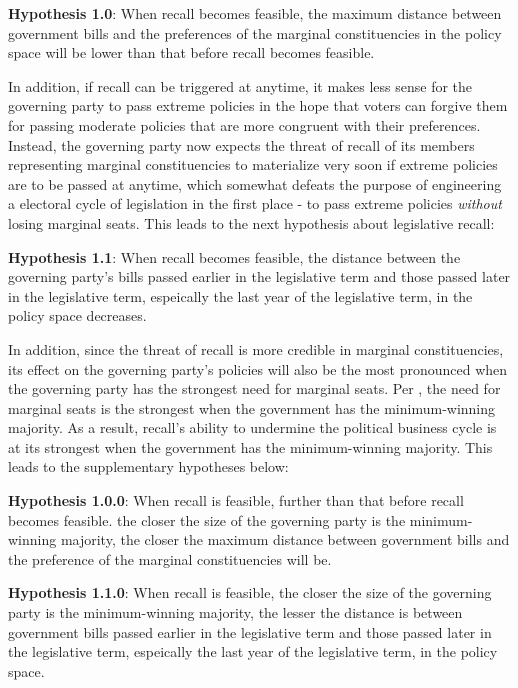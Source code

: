 \documentclass{article}
\begin{document}
		\textbf{Hypothesis 1.0}: When recall becomes feasible,
		the maximum distance between government bills
		and the preferences of the marginal constituencies in the policy space will be lower
		than that before recall becomes feasible.
		
		In addition,
		if recall can be triggered at anytime,
		it makes less sense
		for the governing party
		to pass extreme policies
		in the hope that
		voters can forgive them for passing moderate policies
		that are more congruent with their preferences.
		Instead,
		the governing party now expects the threat of recall 
		of its members representing marginal constituencies
		to materialize very soon if extreme policies are to be passed
		at anytime,
		which somewhat defeats the purpose of engineering a electoral cycle of legislation in the first place -
		to pass extreme policies \textit{without} losing marginal seats.
		This leads to the next hypothesis about legislative recall:
		
		\textbf{Hypothesis 1.1}: When recall becomes feasible,
		the distance between the governing party's bills passed earlier in the legislative term
		and those passed later in the legislative term,
		espeically the last year of the legislative term,
		in the policy space decreases.
		
		
		In addition,
		since
		the threat of recall is more credible in marginal constituencies,
		its effect on the governing party's policies
		will also be the most pronounced when the governing party
		has the strongest need for marginal seats.
		Per
		\citeauthor{stroblElectoralCyclesGovernment2021}
		\autocite*{stroblElectoralCyclesGovernment2021},
		the need for marginal seats is the strongest
		when the government has the minimum-winning majority.
		As a result, recall's ability to undermine the political business cycle
		is at its strongest when the government has the minimum-winning majority.
		This leads to the supplementary hypotheses below:
		
		\textbf{Hypothesis 1.0.0}: When recall is feasible,
		further than that before recall becomes feasible.
		the closer the size of the governing party is the minimum-winning majority,
		the closer
		the maximum distance between government bills
		and the preference of the marginal constituencies will be.
		
		\textbf{Hypothesis 1.1.0}: When recall is feasible,
		the closer the size of the governing party is the minimum-winning majority,
		the lesser the distance is between government bills passed earlier in the legislative term
		and those passed later in the legislative term,
		espeically the last year of the legislative term,
		in the policy space.
		
\end{document}
